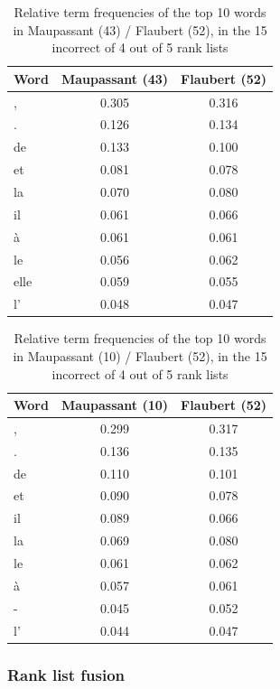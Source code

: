 \begin{table}
  \caption{Relative term frequencies of the top 10 words in Maupassant (43) / Flaubert (52), in the 15 incorrect of 4 out of 5 rank lists}
  \label{tab:errors2}
  \begin{tabular}{|l|c|c|}
      \hline
      Word & Maupassant (43) & Flaubert (52) \\
      \hline
      , & 0.305 & 0.316 \\
      . & 0.126 & 0.134 \\
      de & 0.133 & 0.100 \\
      et & 0.081 & 0.078 \\
      la & 0.070 & 0.080 \\
      il & 0.061 & 0.066 \\
      à & 0.061 & 0.061 \\
      le & 0.056 & 0.062 \\
      elle & 0.059 & 0.055 \\
      l' & 0.048 & 0.047 \\
      \hline
  \end{tabular}
\end{table}

\begin{table}
  \caption{Relative term frequencies of the top 10 words in Maupassant (10) / Flaubert (52), in the 15 incorrect of 4 out of 5 rank lists}
  \label{tab:errors3}
  \begin{tabular}{|l|c|c|}
      \hline
      Word & Maupassant (10) & Flaubert (52) \\
      \hline
      , & 0.299 & 0.317 \\
      . & 0.136 & 0.135 \\
      de & 0.110 & 0.101 \\
      et & 0.090 & 0.078 \\
      il & 0.089 & 0.066 \\
      la & 0.069 & 0.080 \\
      le & 0.061 & 0.062 \\
      à & 0.057 & 0.061 \\
      - & 0.045 & 0.052 \\
      l' & 0.044 & 0.047 \\
      \hline
  \end{tabular}
\end{table}


\subsubsection{Rank list fusion}

